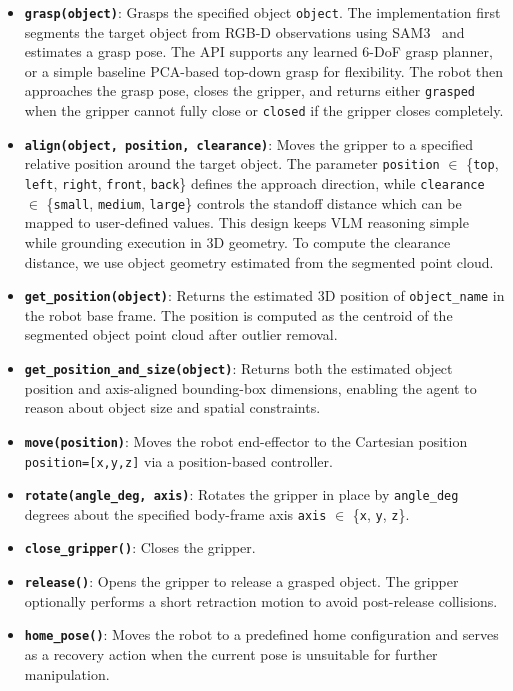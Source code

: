 \documentclass{llmxive}
\begin{document}
\begin{itemize}
\item \textbf{\texttt{grasp(object)}}: Grasps the specified object \texttt{object}. The implementation first segments the target object from RGB-D observations using SAM3~\citep{carion2025sam} and estimates a grasp pose. The API supports any learned 6-DoF grasp planner, or a simple baseline PCA-based top-down grasp for flexibility. The robot then approaches the grasp pose, closes the gripper, and returns either \texttt{grasped} when the gripper cannot fully close or \texttt{closed} if the gripper closes completely.

\item \textbf{\texttt{align(object, position, clearance)}}: 
Moves the gripper to a specified relative position around the target object. 
The parameter \texttt{position} $\in$ \{\texttt{top}, \texttt{left}, \texttt{right}, \texttt{front}, \texttt{back}\} defines the approach direction, while \texttt{clearance} $\in$ \{\texttt{small}, \texttt{medium}, \texttt{large}\} controls the standoff distance which can be mapped to user-defined values. 
This design keeps VLM reasoning simple while grounding execution in 3D geometry.
To compute the clearance distance, we use object geometry estimated from the segmented point cloud.

\item \textbf{\texttt{get\_position(object)}}: Returns the estimated 3D position of \texttt{object\_name} in the robot base frame. The position is computed as the centroid of the segmented object point cloud after outlier removal.

\item \textbf{\texttt{get\_position\_and\_size(object)}}: Returns both the estimated object position and axis-aligned bounding-box dimensions, enabling the agent to reason about object size and spatial constraints.

\item \textbf{\texttt{move(position)}}: Moves the robot end-effector to the Cartesian position \texttt{position=[x,y,z]} via a position-based controller.

\item \textbf{\texttt{rotate(angle\_deg, axis)}}: Rotates the gripper in place by \texttt{angle\_deg} degrees about the specified body-frame axis \texttt{axis} $\in$ \{\texttt{x}, \texttt{y}, \texttt{z}\}.

\item \textbf{\texttt{close\_gripper()}}: Closes the gripper.

\item \textbf{\texttt{release()}}: Opens the gripper to release a grasped object. The gripper optionally performs a short retraction motion to avoid post-release collisions.

\item \textbf{\texttt{home\_pose()}}: Moves the robot to a predefined home configuration and serves as a recovery action when the current pose is unsuitable for further manipulation.

\end{itemize}
\end{document}
